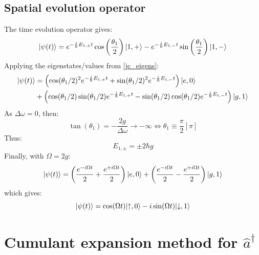 \documentclass[11pt]{report}
\DeclarePairedDelimiter\ket{\lvert}{\rangle}
\begin{document}
\subsection{Spatial evolution operator}
\label{spatial_evol_op}

The time evolution operator gives:
\begin{equation}
\ket{\psi(t)} = e^{-\frac{i}{\hbar}E_{1,+}t} \cos\left(\frac{\theta_{1}}{2}\right) \ket{1, +} - e^{-\frac{i}{\hbar}E_{1,-}t} \sin\left(\frac{\theta_{1}}{2}\right) \ket{1, -}
\end{equation}
Applying the eigenstates/values from \ref{jc_eigens}:
\begin{align}
\begin{split}
\ket{\psi(t)} &= \left( \cos(\theta_1/2)^2 e^{-\frac{i}{\hbar}E_{1,+}t} + \sin(\theta_1/2)^2 e^{-\frac{i}{\hbar}E_{1,-}t} \right) \ket{e, 0} \\
&+ \left( \cos(\theta_1/2) \sin(\theta_1/2) e^{-\frac{i}{\hbar}E_{1,+}t} - \sin(\theta_1/2) \cos(\theta_1/2) e^{-\frac{i}{\hbar}E_{1,-}t} \right) \ket{g, 1}
\end{split}
\end{align}
As $\Delta\omega = 0$, then:
\begin{equation}
\tan(\theta_1) = -\frac{2g}{\Delta\omega} \rightarrow -\infty \Leftrightarrow \theta_1 \equiv \frac{\pi}{2} \left[\pi\right]
\end{equation}
Thus:
\begin{equation}
E_{1,\pm} = \pm 2\hbar g
\end{equation}
Finally, with $\Omega = 2g$:
\begin{equation}
\ket{\psi(t)} = \left( \frac{e^{-i\Omega t}}{2} + \frac{e^{+i\Omega t}}{2} \right) \ket{e, 0} + \left( \frac{e^{-i\Omega t}}{2} - \frac{e^{+i\Omega t}}{2} \right) \ket{g, 1}
\end{equation}
which gives:
\begin{equation}
\ket{\psi(t)} = \cos(\Omega t) \ket{\uparrow, 0} - i \sin(\Omega t) \ket{\downarrow, 1}
\end{equation}

\section{Cumulant expansion method for $\hat{a}^\dag$}
\label{cumu_exp_for_ad}
\end{document}
